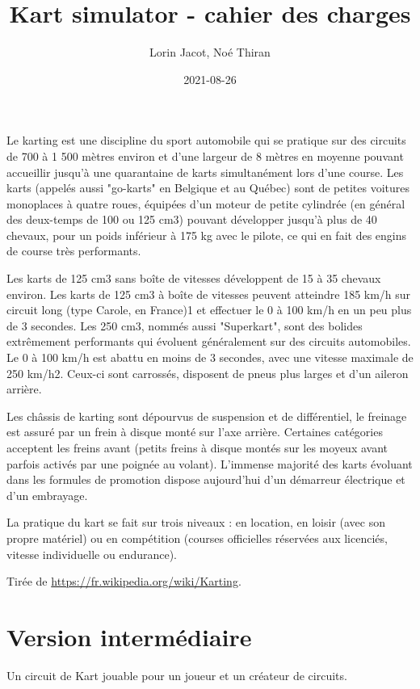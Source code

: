 \documentclass{article}
\title{Kart simulator - cahier des charges}
\date{2021-08-26}
\author{Lorin Jacot, Noé Thiran}
\begin{document}
\maketitle
{}

Le karting est une discipline du sport automobile qui se pratique sur des circuits de 700 à 1 500 mètres environ et d'une largeur de 8 mètres en moyenne pouvant accueillir jusqu'à une quarantaine de karts simultanément lors d'une course. Les karts (appelés aussi "go-karts" en Belgique et au Québec) sont de petites voitures monoplaces à quatre roues, équipées d’un moteur de petite cylindrée (en général des deux-temps de 100 ou 125 cm3) pouvant développer jusqu'à plus de 40 chevaux, pour un poids inférieur à 175 kg avec le pilote, ce qui en fait des engins de course très performants.

Les karts de 125 cm3 sans boîte de vitesses développent de 15 à 35 chevaux environ.
Les karts de 125 cm3 à boîte de vitesses peuvent atteindre 185 km/h sur circuit long (type Carole, en France)1 et effectuer le 0 à 100 km/h en un peu plus de 3 secondes.
Les 250 cm3, nommés aussi "Superkart", sont des bolides extrêmement performants qui évoluent généralement sur des circuits automobiles. Le 0 à 100 km/h est abattu en moins de 3 secondes, avec une vitesse maximale de 250 km/h2. Ceux-ci sont carrossés, disposent de pneus plus larges et d'un aileron arrière.

Les châssis de karting sont dépourvus de suspension et de différentiel, le freinage est assuré par un frein à disque monté sur l'axe arrière. Certaines catégories acceptent les freins avant (petits freins à disque montés sur les moyeux avant parfois activés par une poignée au volant). L'immense majorité des karts évoluant dans les formules de promotion dispose aujourd'hui d'un démarreur électrique et d'un embrayage.

La pratique du kart se fait sur trois niveaux : en location, en loisir (avec son propre matériel) ou en compétition (courses officielles réservées aux licenciés, vitesse individuelle ou endurance).

Tirée de \url{https://fr.wikipedia.org/wiki/Karting}.

\newpage
{}

\section{Version intermédiaire}

Un circuit de Kart jouable pour un joueur et un créateur de circuits.
\end{document}
